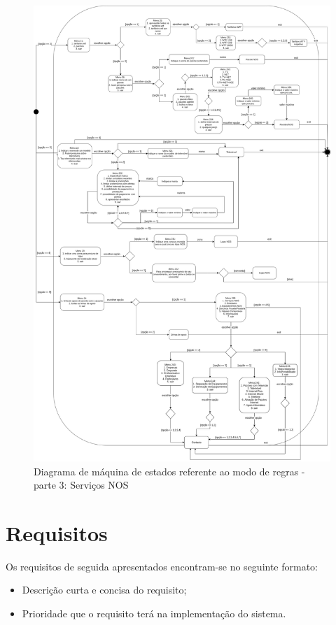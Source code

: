 \documentclass[11pt,a4paper]{article}
\begin{document}
\begin{appendices}
\begin{figure}[H]
    \centering
    \includegraphics[width=12cm]{images/PEI_StateMachine-FornecedorServicos.png}
    \caption{Diagrama de máquina de estados referente ao modo de regras - parte 3: Serviços NOS}
    \label{machine3}
\end{figure}

\newpage

\section{Requisitos} \label{anexo2}

Os requisitos de seguida apresentados encontram-se no seguinte formato:
\begin{itemize}
    \item Descrição curta e concisa do requisito;
    \item Prioridade que o requisito terá na implementação do sistema.
\end{itemize}


\end{appendices}
\end{document}
